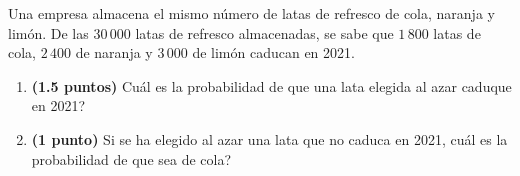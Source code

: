 
Una empresa almacena el mismo número de latas de refresco de cola, naranja
y limón. De las $30\,000$ latas de refresco almacenadas, se sabe que $1\,800$
latas de cola, $2\,400$ de naranja y $3\,000$ de limón caducan en 2021.
\begin{enumerate}[label=\alph*)]
  \item \textbf{(1.5 puntos)} \textquestiondown{}Cuál es la probabilidad de
  que una lata elegida al azar caduque en 2021?
  \item \textbf{(1 punto)} Si se ha elegido al azar una lata que no caduca
  en 2021, \textquestiondown{}cuál es la probabilidad de que sea de cola?
\end{enumerate}
